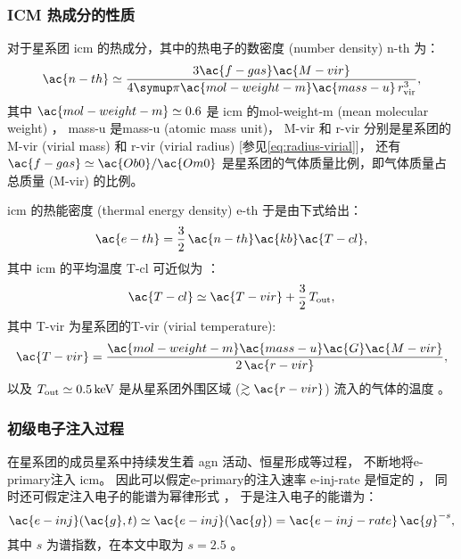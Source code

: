 \subsubsection{ICM 热成分的性质}

对于星系团 \ac{icm} 的热成分，其中的热电子的数密度 (number density) \ac{n-th} 为：
\begin{equation}
  \label{eq:n-th}
  \ac{n-th} \simeq
    \frac{3 \ac{f-gas} \ac{M-vir}}{
      4\Cpi \ac{mol-weight-m} \ac{mass-u} \,r^3_{\R{vir}}} ,
\end{equation}
其中
$\ac{mol-weight-m} \simeq 0.6$ 是 \ac{icm} 的\acl{mol-weight-m}
(mean molecular weight) \cite{ettori2013}，
\ac{mass-u} 是\acl{mass-u} (atomic mass unit)，
\ac{M-vir} 和 \ac{r-vir} 分别是星系团的\acl{M-vir} (virial mass) 和
\acl{r-vir} (virial radius) [参见\autoref{eq:radius-virial}]，
还有 $\ac{f-gas} \simeq \ac{Ob0}/\ac{Om0}$
是星系团的气体质量比例，即气体质量占总质量 (\ac{M-vir}) 的比例。

\ac{icm} 的热能密度 (thermal energy density) \ac{e-th} 于是由下式给出：
\begin{equation}
  \label{eq:e-th}
  \ac{e-th} = \frac{3}{2} \,\ac{n-th} \ac{kb} \ac{T-cl} ,
\end{equation}
其中 \ac{icm} 的平均温度 \ac{T-cl} 可近似为 \cite{cavaliere1998}：
\begin{equation}
  \label{eq:t-icm}
  \ac{T-cl} \simeq \ac{T-vir} + \frac{3}{2} \,T_{\R{out}} ,
\end{equation}
其中 \ac{T-vir} 为星系团的\acl{T-vir} (virial temperature):
\begin{equation}
  \ac{T-vir} =
    \frac{\ac{mol-weight-m} \ac{mass-u} \ac{G} \ac{M-vir}}{2\,\ac{r-vir}} ,
\end{equation}
以及 $T_{\R{out}} \simeq \SI{0.5}{\keV}$
是从星系团外围区域 ($\gtrsim \ac{r-vir}$) 流入的气体的温度 \cite{fujita2003}。

\subsubsection{初级电子注入过程}

在星系团的成员星系中持续发生着 \ac{agn} 活动、恒星形成等过程，
不断地将\ac{e-primary}注入 \ac{icm}。
因此可以假定\ac{e-primary}的注入速率 \ac{e-inj-rate} 是恒定的
\cite{cassano2005,donnert2014}，
同时还可假定注入电子的能谱为幂律形式 \cite{sarazin1999}，
于是注入电子的能谱为：
\begin{equation}
  \label{eq:electron-inj}
  \ac{e-inj}(\ac{g}, t)
    \simeq \ac{e-inj}(\ac{g})
    = \ac{e-inj-rate} \,\ac{g}^{-s} ,
\end{equation}
其中 $s$ 为谱指数，在本文中取为 $s = 2.5$ \cite{cassano2005}。

